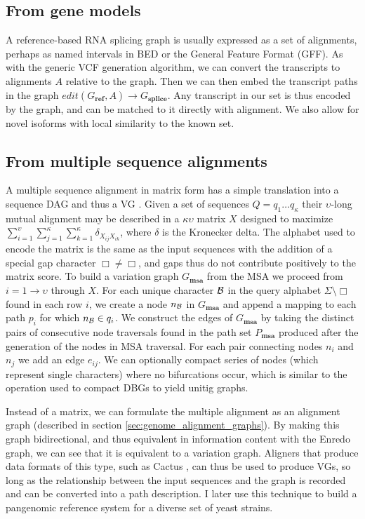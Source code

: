 \subsection{From gene models} %

A reference-based RNA splicing graph is usually expressed as a set of alignments, perhaps as named intervals in BED or the General Feature Format (GFF).
As with the generic VCF generation algorithm, we can convert the transcripts to alignments $A$ relative to the graph.
Then we can then embed the transcript paths in the graph $edit(G_\textbf{ref}, A) \to G_\textbf{splice}$.
Any transcript in our set is thus encoded by the graph, and can be matched to it directly with alignment.
We also allow for novel isoforms with local similarity to the known set.

\subsection{From multiple sequence alignments}
A multiple sequence alignment in matrix form has a simple translation into a sequence DAG and thus a VG \cite{lee2002POA}.
Given a set of sequences $Q = q_1 \ldots q_\kappa$ their $\upsilon$-long mutual alignment may be described in a $\kappa \upsilon$ matrix $X$ designed to maximize $\sum_{i=1}^{\upsilon} \sum_{j=1}^{\kappa} \sum_{k=1}^{\kappa} \delta_{X_{ij}X_{ik}}$, where $\delta$ is the Kronecker delta.
The alphabet used to encode the matrix is the same as the input sequences with the addition of a special gap character $\Box \neq \Box$, and gaps thus do not contribute positively to the matrix score.
To build a variation graph $G_\textbf{msa}$ from the MSA we proceed from $i = 1 \to \upsilon$ through $X$.
For each unique character ${\cal B}$ in the query alphabet $\Sigma \setminus \Box$ found in each row $i$, we create a node $n_{\cal B}$ in $G_\textbf{msa}$ and append a mapping to each path $p_i$ for which $n_{\cal B} \in q_i$.
We construct the edges of $G_\textbf{msa}$ by taking the distinct pairs of consecutive node traversals found in the path set $P_\textbf{msa}$ produced after the generation of the nodes in MSA traversal.
For each pair connecting nodes $n_i$ and $n_j$ we add an edge $e_{ij}$.
We can optionally compact series of nodes (which represent single characters) where no bifurcations occur, which is similar to the operation used to compact DBGs to yield unitig graphs.

Instead of a matrix, we can formulate the multiple alignment as an alignment graph (described in section \ref{sec:genome_alignment_graphs}).
By making this graph bidirectional, and thus equivalent in information content with the Enredo graph, we can see that it is equivalent to a variation graph.
Aligners that produce data formats of this type, such as Cactus \cite{Paten:2011fva}, can thus be used to produce VGs, so long as the relationship between the input sequences and the graph is recorded and can be converted into a path description.
I later use this technique to build a pangenomic reference system for a diverse set of yeast strains.


